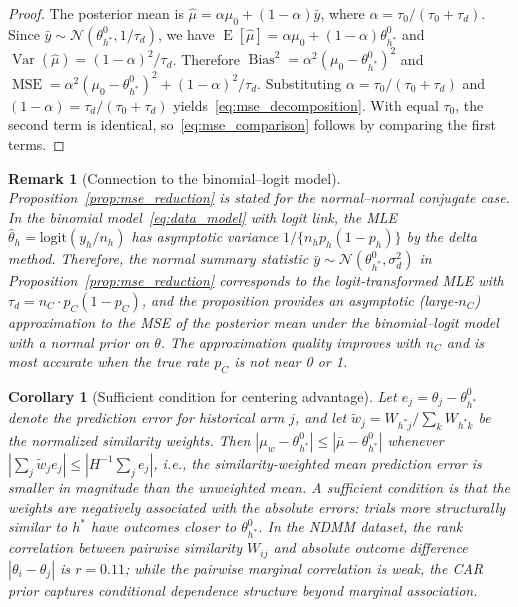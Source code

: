 \documentclass[12pt]{article}
\newtheorem{corollary}{Corollary}
\newtheorem{remark}{Remark}
\begin{document}
\begin{proof}
The posterior mean is $\hat{\mu} = \alpha \mu_0 + (1 - \alpha) \bar{y}$, where $\alpha = \tau_0 / (\tau_0 + \tau_d)$. Since $\bar{y} \sim \mathcal{N}(\theta_{h^*}^0, 1/\tau_d)$, we have $\operatorname{E}[\hat{\mu}] = \alpha \mu_0 + (1 - \alpha) \theta_{h^*}^0$ and $\operatorname{Var}(\hat{\mu}) = (1-\alpha)^2 / \tau_d$. Therefore $\operatorname{Bias}^2 = \alpha^2 (\mu_0 - \theta_{h^*}^0)^2$ and $\operatorname{MSE} = \alpha^2 (\mu_0 - \theta_{h^*}^0)^2 + (1-\alpha)^2 / \tau_d$. Substituting $\alpha = \tau_0/(\tau_0 + \tau_d)$ and $(1-\alpha) = \tau_d/(\tau_0 + \tau_d)$ yields~\eqref{eq:mse_decomposition}. With equal $\tau_0$, the second term is identical, so~\eqref{eq:mse_comparison} follows by comparing the first terms.
\end{proof}

\begin{remark}[Connection to the binomial--logit model]
\label{rem:logit_connection}
Proposition~\ref{prop:mse_reduction} is stated for the normal--normal conjugate case. In the binomial model~\eqref{eq:data_model} with logit link, the MLE $\hat{\theta}_h = \text{logit}(y_h / n_h)$ has asymptotic variance $1/\{n_h p_h(1-p_h)\}$ by the delta method. Therefore, the normal summary statistic $\bar{y} \sim \mathcal{N}(\theta_{h^*}^0, \sigma_d^2)$ in Proposition~\ref{prop:mse_reduction} corresponds to the logit-transformed MLE with $\tau_d = n_C \cdot p_C(1 - p_C)$, and the proposition provides an asymptotic (large-$n_C$) approximation to the MSE of the posterior mean under the binomial--logit model with a normal prior on $\theta$. The approximation quality improves with $n_C$ and is most accurate when the true rate $p_C$ is not near 0 or 1.
\end{remark}

\begin{corollary}[Sufficient condition for centering advantage]
\label{cor:centering}
Let $e_j = \theta_j - \theta_{h^*}^0$ denote the prediction error for historical arm $j$, and let $\tilde{w}_j = W_{h^*j} / \sum_k W_{h^*k}$ be the normalized similarity weights. Then $|\mu_w - \theta_{h^*}^0| \leq |\bar{\mu} - \theta_{h^*}^0|$ whenever $|\sum_j \tilde{w}_j e_j| \leq |H^{-1} \sum_j e_j|$, i.e., the similarity-weighted mean prediction error is smaller in magnitude than the unweighted mean. A sufficient condition is that the weights are negatively associated with the absolute errors: trials more structurally similar to $h^*$ have outcomes closer to $\theta_{h^*}^0$. In the NDMM dataset, the rank correlation between pairwise similarity $W_{ij}$ and absolute outcome difference $|\theta_i - \theta_j|$ is $r = 0.11$; while the pairwise marginal correlation is weak, the CAR prior captures conditional dependence structure beyond marginal association.
\end{corollary}
\end{document}
